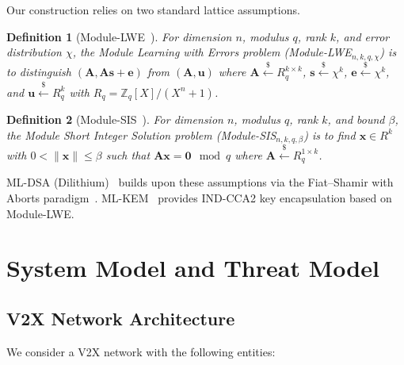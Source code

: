 \documentclass[conference,10pt]{IEEEtran}
\newcommand{\MSIS}{\textsf{Module-SIS}}
\newcommand{\MLWE}{\textsf{Module-LWE}}
\newtheorem{definition}{Definition}
\begin{document}
Our construction relies on two standard lattice assumptions.

\begin{definition}[Module-LWE~\cite{regev2005, langlois2015sis}]
For dimension $n$, modulus $q$, rank $k$, and error distribution $\chi$, the Module Learning with Errors problem (\MLWE{}$_{n,k,q,\chi}$) is to distinguish $(\mathbf{A}, \mathbf{A}\mathbf{s} + \mathbf{e})$ from $(\mathbf{A}, \mathbf{u})$ where $\mathbf{A} \xleftarrow{\$} R_q^{k \times k}$, $\mathbf{s} \xleftarrow{\$} \chi^k$, $\mathbf{e} \xleftarrow{\$} \chi^k$, and $\mathbf{u} \xleftarrow{\$} R_q^k$ with $R_q = \mathbb{Z}_q[X]/(X^n+1)$.
\end{definition}

\begin{definition}[Module-SIS~\cite{langlois2015sis}]
For dimension $n$, modulus $q$, rank $k$, and bound $\beta$, the Module Short Integer Solution problem (\MSIS{}$_{n,k,q,\beta}$) is to find $\mathbf{x} \in R^k$ with $0 < \|\mathbf{x}\| \leq \beta$ such that $\mathbf{A}\mathbf{x} = \mathbf{0} \mod q$ where $\mathbf{A} \xleftarrow{\$} R_q^{1 \times k}$.
\end{definition}

ML-DSA (Dilithium)~\cite{fips204} builds upon these assumptions via the Fiat--Shamir with Aborts paradigm~\cite{lyubashevsky2010}. ML-KEM~\cite{fips203} provides IND-CCA2 key encapsulation based on Module-LWE.

\section{System Model and Threat Model}
\label{sec:system_model}

\subsection{V2X Network Architecture}

We consider a V2X network with the following entities:
\end{document}
